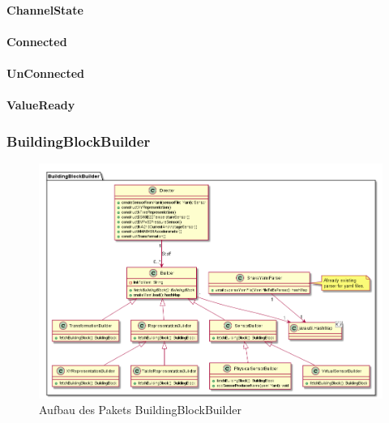 \documentclass[parskip=full]{scrartcl}
\begin{document}
\paragraph{ChannelState}
\paragraph{Connected}
\paragraph{UnConnected}
\paragraph{ValueReady}


\subsubsection{BuildingBlockBuilder}
\begin{figure}[htbp]
	\begin{center}
		\includegraphics[width = 16cm]{Grafiken/BuildingBlockBuilder.png}
		\caption{Aufbau des Pakets BuildingBlockBuilder}
		\label{BuildingBlockBuilder}
	\end{center}
\end{figure}
\end{document}

